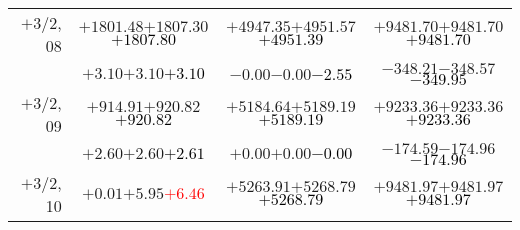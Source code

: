 \documentclass[compress]{beamer}
\begin{document}
\begin{frame}
{\begin{tabular}{r | c | c | c}
$+$3/2, 08 & $+1801.48$\hspace{0.1 cm}$+1807.30$\hspace{0.1 cm}\textcolor{black}{$+1807.80$} & $+4947.35$\hspace{0.1 cm}$+4951.57$\hspace{0.1 cm}\textcolor{black}{$+4951.39$} & $+9481.70$\hspace{0.1 cm}$+9481.70$\hspace{0.1 cm}\textcolor{black}{$+9481.70$} \\
           & $+3.10$\hspace{0.1 cm}$+3.10$\hspace{0.1 cm}\textcolor{black}{$+3.10$} & $-0.00$\hspace{0.1 cm}$-0.00$\hspace{0.1 cm}\textcolor{black}{$-2.55$} & $-348.21$\hspace{0.1 cm}$-348.57$\hspace{0.1 cm}\textcolor{black}{$-349.95$} \\
$+$3/2, 09 & $+914.91$\hspace{0.1 cm}$+920.82$\hspace{0.1 cm}\textcolor{black}{$+920.82$} & $+5184.64$\hspace{0.1 cm}$+5189.19$\hspace{0.1 cm}\textcolor{black}{$+5189.19$} & $+9233.36$\hspace{0.1 cm}$+9233.36$\hspace{0.1 cm}\textcolor{black}{$+9233.36$} \\
           & $+2.60$\hspace{0.1 cm}$+2.60$\hspace{0.1 cm}\textcolor{black}{$+2.61$} & $+0.00$\hspace{0.1 cm}$+0.00$\hspace{0.1 cm}\textcolor{black}{$-0.00$} & $-174.59$\hspace{0.1 cm}$-174.96$\hspace{0.1 cm}\textcolor{black}{$-174.96$} \\
$+$3/2, 10 & $+0.01$\hspace{0.1 cm}$+5.95$\hspace{0.1 cm}\textcolor{red}{$+6.46$} & $+5263.91$\hspace{0.1 cm}$+5268.79$\hspace{0.1 cm}\textcolor{black}{$+5268.79$} & $+9481.97$\hspace{0.1 cm}$+9481.97$\hspace{0.1 cm}\textcolor{black}{$+9481.97$} \\

\end{tabular}}
\end{frame}
\end{document}
